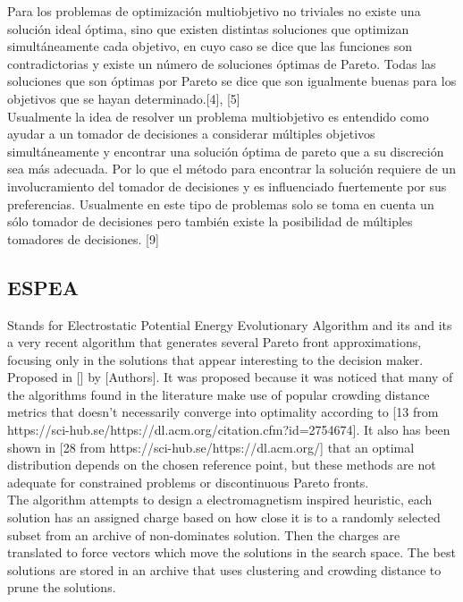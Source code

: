 Para los problemas de optimización multiobjetivo no triviales no existe una solución ideal óptima, sino que existen distintas soluciones que optimizan simultáneamente cada objetivo, en cuyo caso se dice que las funciones son contradictorias y existe un número de soluciones óptimas de Pareto. Todas las soluciones que son óptimas por Pareto se dice que son igualmente buenas para los objetivos que se hayan determinado.[4], [5] \\

Usualmente la idea de resolver un problema multiobjetivo es entendido como ayudar a un tomador de decisiones a considerar múltiples objetivos simultáneamente y encontrar una solución óptima de pareto que a su discreción sea más adecuada. Por lo que el método para encontrar la solución requiere de un involucramiento del tomador de decisiones y es influenciado fuertemente por sus preferencias. Usualmente en este tipo de problemas solo se toma en cuenta un sólo tomador de decisiones pero también existe la posibilidad de múltiples tomadores de decisiones. [9]

\subsection{ESPEA}

Stands for Electrostatic Potential Energy Evolutionary Algorithm and its and its a very recent algorithm that generates several Pareto front approximations, focusing only in the solutions that appear interesting to the decision maker. Proposed in []
by [Authors]. It was proposed because it was noticed that many of the algorithms found in the literature make use of popular crowding distance metrics that doesn't necessarily converge into optimality according to [13 from https://sci-hub.se/https://dl.acm.org/citation.cfm?id=2754674]. It also has been shown in [28 from https://sci-hub.se/https://dl.acm.org/] that an optimal distribution depends on the chosen reference point, but these methods are not adequate for constrained problems or discontinuous Pareto fronts.\\

The algorithm attempts to design a electromagnetism inspired heuristic, each solution has an assigned charge based on how close it is to a randomly selected subset from an archive of non-dominates solution. Then the charges are translated to force vectors which move the solutions in the search space. The best solutions are stored in an archive that uses clustering and crowding distance to prune the solutions.\\

